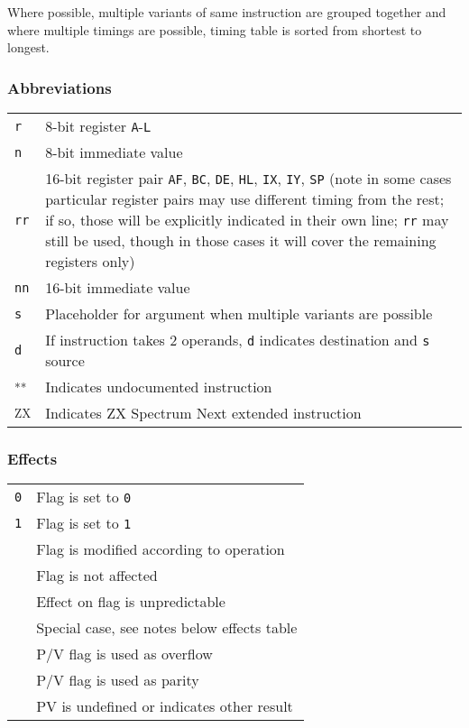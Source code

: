 \documentclass[12pt,twoside,openright,a4paper]{book}
\newcommand{\UNDOC}{\textnormal{\textsuperscript{**}}}
\newcommand{\ZXN}{\textnormal{\textsuperscript{ZX}}}
\begin{document}
Where possible, multiple variants of same instruction are grouped together and where multiple timings are possible, timing table is sorted from shortest to longest.

\pagebreak

\subsubsection{Abbreviations}

\begin{tabularx}{\textwidth}{lX}
	{\tt r} & 
		8-bit register {\tt A}-{\tt L} \\
	{\tt n} &
		8-bit immediate value \\
	{\tt rr} & 
		16-bit register pair {\tt AF}, {\tt BC}, {\tt DE}, {\tt HL}, {\tt IX}, {\tt IY}, {\tt SP} (note in some cases particular register pairs may use different timing from the rest; if so, those will be explicitly indicated in their own line; {\tt rr} may still be used, though in those cases it will cover the remaining registers only) \\
	{\tt nn} & 
		16-bit immediate value \\
	{\tt s} &
		Placeholder for argument when multiple variants are possible \\
	{\tt d} &
		If instruction takes 2 operands, {\tt d} indicates destination and {\tt s} source \\
	\UNDOC & Indicates undocumented instruction \\
	\ZXN & Indicates ZX Spectrum Next extended instruction \\		
\end{tabularx}

\subsubsection{Effects}

\begin{tabular}{cl}
	{\tt 0} & Flag is set to {\tt 0} \\
	{\tt 1} & Flag is set to {\tt 1} \\
	{\tt \FS} & Flag is modified according to operation \\
	{\tt \FN} & Flag is not affected \\
	{\tt \FU} & Effect on flag is unpredictable \\
	{\tt \FX} & Special case, see notes below effects table \\
	\DetailParityOverflow{v} & P/V flag is used as overflow \\
	\DetailParityOverflow{p} & P/V flag is used as parity \\
	\DetailParityOverflow{} & PV is undefined or indicates other result \\
\end{tabular}
\end{document}
